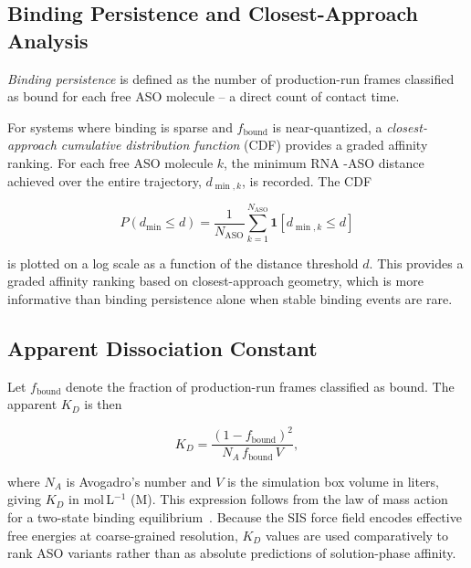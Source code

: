 \subsection{Binding Persistence and Closest-Approach Analysis}

\emph{Binding persistence} is defined as the number of production-run
frames classified as bound for each free ASO molecule  -- a direct count
of contact time.

For systems where binding is sparse and $f_\text{bound}$ is
near-quantized, a \emph{closest-approach cumulative distribution
function} (CDF) provides a graded affinity ranking.
For each free ASO molecule $k$, the minimum RNA -ASO distance achieved
over the entire trajectory, $d_{\min,k}$, is recorded.
The CDF

\begin{equation}
  P(d_{\min} \leq d) = \frac{1}{N_\text{ASO}}
    \sum_{k=1}^{N_\text{ASO}} \mathbf{1}[d_{\min,k} \leq d]
  \label{eq:cdf}
\end{equation}

is plotted on a log scale as a function of the distance threshold $d$.
This provides a graded affinity ranking based on closest-approach
geometry, which is more informative than binding persistence alone when
stable binding events are rare.

\subsection{Apparent Dissociation Constant}
\label{sec:kd}

Let $f_{\mathrm{bound}}$ denote the fraction of production-run frames
classified as bound.
The apparent $K_D$ is then

\begin{equation}
  K_D = \frac{(1 - f_{\mathrm{bound}})^2}{N_A \, f_{\mathrm{bound}} \, V},
  \label{eq:KD}
\end{equation}

where $N_A$ is Avogadro's number and $V$ is the simulation box volume
in liters, giving $K_D$ in mol\,L$^{-1}$ (M).
This expression follows from the law of mass action for a two-state
binding equilibrium~\cite{Tesei2021}.
Because the SIS force field encodes effective free energies at
coarse-grained resolution, $K_D$ values are used comparatively to rank
ASO variants rather than as absolute predictions of solution-phase
affinity.

